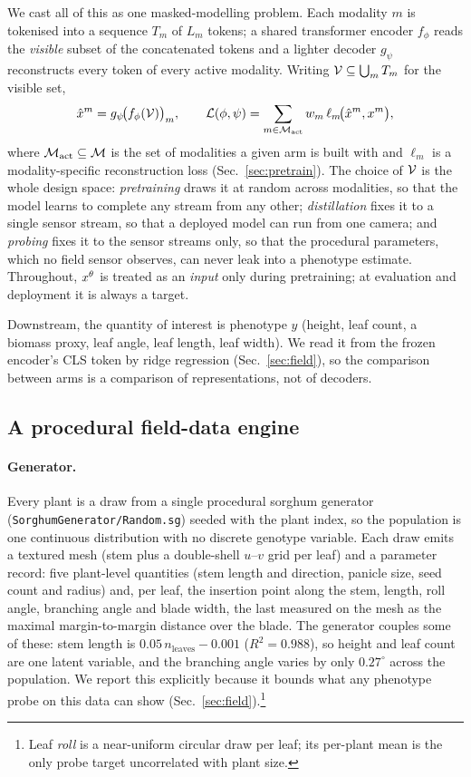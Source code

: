 We cast all of this as one masked-modelling problem. Each modality $m$ is
tokenised into a sequence $T_m$ of $L_m$ tokens; a shared transformer encoder
$f_\phi$ reads the \emph{visible} subset of the concatenated tokens and a lighter
decoder $g_\psi$ reconstructs every token of every active modality. Writing
$\mathcal{V}\subseteq\bigcup_m T_m$ for the visible set,
\begin{equation}
  \hat{x}^{m} = g_\psi\!\big(f_\phi(\mathcal{V})\big)_m, \qquad
  \mathcal{L}(\phi,\psi) = \sum_{m\in\mathcal{M}_{\mathrm{act}}} w_m\,\ell_m\!\big(\hat{x}^{m},x^{m}\big),
  \label{eq:objective}
\end{equation}
where $\mathcal{M}_{\mathrm{act}}\subseteq\mathcal{M}$ is the set of modalities a given arm is
built with and $\ell_m$ is a modality-specific reconstruction loss
(Sec.~\ref{sec:pretrain}). The choice of $\mathcal{V}$ is the whole design space:
\emph{pretraining} draws it at random across modalities, so that the model learns
to complete any stream from any other; \emph{distillation} fixes it to a single
sensor stream, so that a deployed model can run from one camera; and
\emph{probing} fixes it to the sensor streams only, so that the procedural
parameters, which no field sensor observes, can never leak into a phenotype
estimate. Throughout, $x^{\theta}$ is treated as an \emph{input} only during
pretraining; at evaluation and deployment it is always a target.

Downstream, the quantity of interest is phenotype $y$ (height, leaf count, a
biomass proxy, leaf angle, leaf length, leaf width). We read it from the frozen
encoder's CLS token by ridge regression (Sec.~\ref{sec:field}), so the comparison
between arms is a comparison of representations, not of decoders.

\subsection{A procedural field-data engine}
\label{sec:data}

\paragraph{Generator.}
Every plant is a draw from a single procedural sorghum generator
(\texttt{SorghumGenerator/Random.sg}) seeded with the plant index, so the
population is one continuous distribution with no discrete genotype variable.
Each draw emits a textured mesh (stem plus a double-shell $u$--$v$ grid per leaf)
and a parameter record: five plant-level quantities (stem length and direction,
panicle size, seed count and radius) and, per leaf, the insertion point along the
stem, length, roll angle, branching angle and blade width, the last measured on the
mesh as the maximal margin-to-margin distance over the blade. The generator couples
some of these: stem length is $0.05\,n_{\mathrm{leaves}}-0.001$ ($R^2{=}0.988$), so
height and leaf count are one latent variable, and the branching angle varies by
only $0.27^\circ$ across the population. We report this explicitly because it
bounds what any phenotype probe on this data can show
(Sec.~\ref{sec:field}).\footnote{Leaf \emph{roll} is a near-uniform circular draw per
leaf; its per-plant mean is the only probe target uncorrelated with plant size.}

